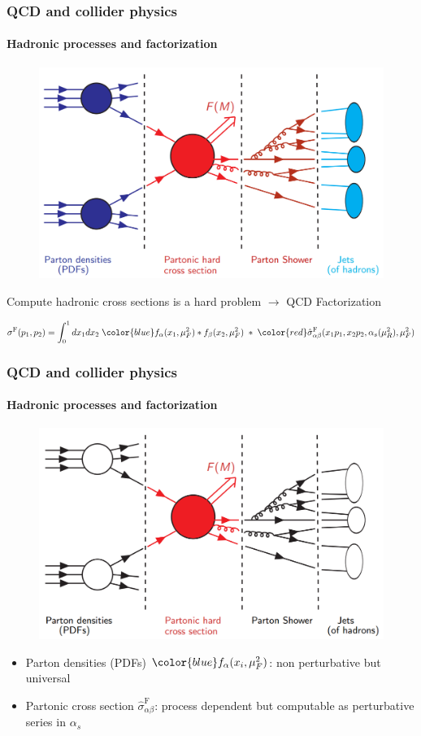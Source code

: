 \documentclass[aspectratio=43]{beamer}
\begin{document}
\begin{frame}

	\frametitle{QCD and collider physics}
	\framesubtitle{Hadronic processes and factorization}
	
	\vspace{0.4 cm}
	
	\begin{figure}
		\includegraphics[width = 7 cm]{plots/part1/chapter2/factorization_1.png}
	\end{figure}
	
	\footnotesize Compute hadronic cross sections is a {\color{red}hard problem} $\longrightarrow$ {\color{blue} QCD Factorization}
	
	\begin{equation}
		\sigma^{\textrm{F}}(p_{1}, p_{2}) =
		\int_{0}^{1} dx_{1} dx_{2} \; {\color{blue} f_{\alpha}(x_{1}, \mu_{F}^{2}) \ast f_{\beta}(x_{2}, \mu_{F}^{2})}
		\; \ast \;  
		{\color{red}\hat{\sigma}^{\textrm{F}}_{\alpha \beta}(x_{1}p_{1}, x_{2}p_{2}, \alpha_{s}(\mu_{R}^{2}), \mu_{F}^{2})} \nonumber
	\end{equation}

\end{frame}

\begin{frame}

	\frametitle{QCD and collider physics}
	\framesubtitle{Hadronic processes and factorization}
	
	\begin{figure}
		\includegraphics[width = 7 cm]{plots/part1/chapter2/factorization_2.png}
	\end{figure}
	
	\begin{itemize}
		\item \footnotesize Parton densities (PDFs) ${\color{blue} f_{\alpha}(x_{i}, \mu_{F}^{2})}$: non perturbative but universal
		\item \footnotesize Partonic cross section {\color{red}$\hat{\sigma}^{\textrm{F}}_{\alpha \beta}$}: process dependent but computable as perturbative series in $\alpha_{s}$
	\end{itemize}

\end{frame}
\end{document}
